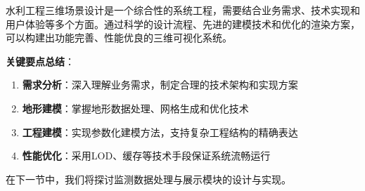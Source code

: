水利工程三维场景设计是一个综合性的系统工程，需要结合业务需求、技术实现和用户体验等多个方面。通过科学的设计流程、先进的建模技术和优化的渲染方案，可以构建出功能完善、性能优良的三维可视化系统。

\textbf{关键要点总结}：

\begin{enumerate}
\def\labelenumi{\arabic{enumi}.}
\item
  \textbf{需求分析}：深入理解业务需求，制定合理的技术架构和实现方案
\item
  \textbf{地形建模}：掌握地形数据处理、网格生成和优化技术
\item
  \textbf{工程建模}：实现参数化建模方法，支持复杂工程结构的精确表达
\item
  \textbf{性能优化}：采用LOD、缓存等技术手段保证系统流畅运行
\end{enumerate}

在下一节中，我们将探讨监测数据处理与展示模块的设计与实现。
